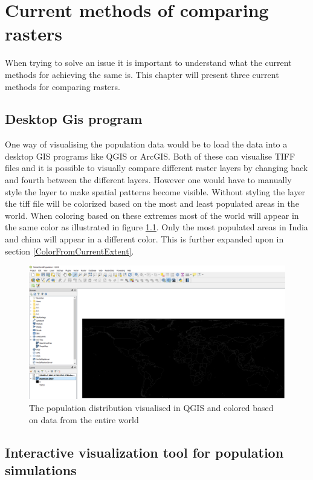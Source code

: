 \chapter{Current methods of comparing rasters}

When trying to solve an issue it is important to understand what the current methods for achieving the same is. This chapter will present three current methods for comparing rasters.

\section{Desktop Gis program}

One way of visualising the population data would be to load the data into a desktop GIS programs like QGIS or ArcGIS. Both of these can visualise TIFF files and it is possible to visually compare different raster layers by changing back and fourth between the different layers. However one would have to manually style the layer to make spatial patterns become visible. Without styling the layer the tiff file will be colorized based on the most and least populated areas in the world. When coloring based on these extremes most of the world will appear in the same color as illustrated in figure \ref{QGIS}. Only the most populated areas in India and china will appear in a different color. This is further expanded upon in section \ref{ColorFromCurrentExtent}.

\begin{figure} [H]
	\centering
	\includegraphics[width=.8\textwidth]{Pictures/QGIS}
	\caption{The population distribution visualised in QGIS and colored based on data from the entire world}
	\label{QGIS}
\end{figure}

\section{Interactive visualization tool for population simulations}

